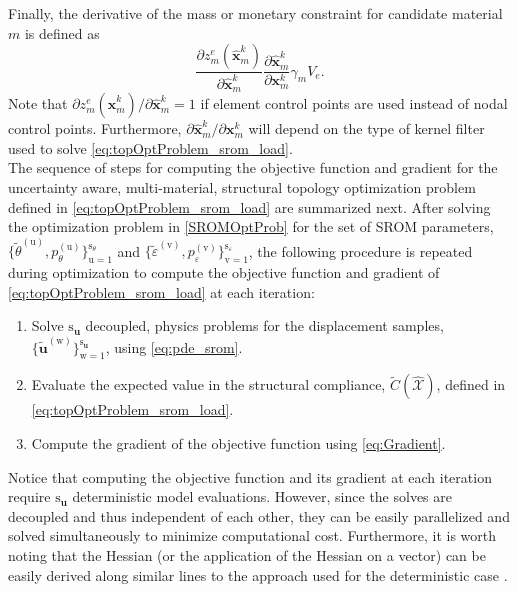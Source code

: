 Finally, the derivative of the mass or monetary constraint for candidate material $m$ is defined as 
\begin{equation}
\label{eq:GradConstraint}
\frac{\partial z_m^e(\hat{\bm x}_m^k)}{\partial\hat{\bm x}_m^k}\frac{\partial\hat{\bm x}_m^k}{\partial\bm x_m^k} \gamma_m V_e.
\end{equation}
Note that $\partial z_m^e(\hat{\bm x}_m^k)/\partial\hat{\bm x}_m^k = 1$ if element control points are used instead of nodal control points. Furthermore, $\partial \hat{\bm x}_m^k / \partial\bm x_m^k$ will depend on the type of kernel filter used to solve \eqref{eq:topOptProblem_srom_load}. \\

The sequence of steps for computing the objective function and gradient for the uncertainty aware, multi-material, structural topology optimization problem defined in \eqref{eq:topOptProblem_srom_load} are summarized next. After solving the optimization problem in \eqref{SROMOptProb} for the set of SROM parameters, $\{ \tilde{\theta}^{(\mathrm{u})}, p_{\theta}^{(\mathrm{u})} \}_{\mathrm{u}=1}^{\mathrm{s}_{\theta}}$ and $\{ \tilde{\varepsilon}^{(\mathrm{v})}, p_{\varepsilon}^{(\mathrm{v})} \}_{\mathrm{v}=1}^{\mathrm{s}_{\varepsilon}}$, the following procedure is repeated during optimization to compute the objective function and gradient of \eqref{eq:topOptProblem_srom_load} at each iteration:
\begin{enumerate}
\item Solve $\mathrm{s}_{\bm u}$ decoupled, physics problems for the displacement samples, $\{\tilde{\bm u}^{(\mathrm{w})}\}_{\mathrm{w}=1}^{\mathrm{s}_{\bm u}}$, using \eqref{eq:pde_srom}.
\item Evaluate the expected value in the structural compliance, $\tilde{C}(\widehat{\mathcal{X}})$, defined in \eqref{eq:topOptProblem_srom_load}.
\item Compute the gradient of the objective function using \eqref{eq:Gradient}.
\end{enumerate}
Notice that computing the objective function and its gradient at each iteration require $\mathrm{s}_{\bm u}$ deterministic model evaluations. However, since the solves are decoupled and thus independent of each other, they can be easily parallelized and solved simultaneously to minimize computational cost. Furthermore, it is worth noting that the Hessian (or the application of the Hessian on a vector) can be easily derived along similar lines to the approach used for the deterministic case \cite{heinkenschloss_2008_implicit}.